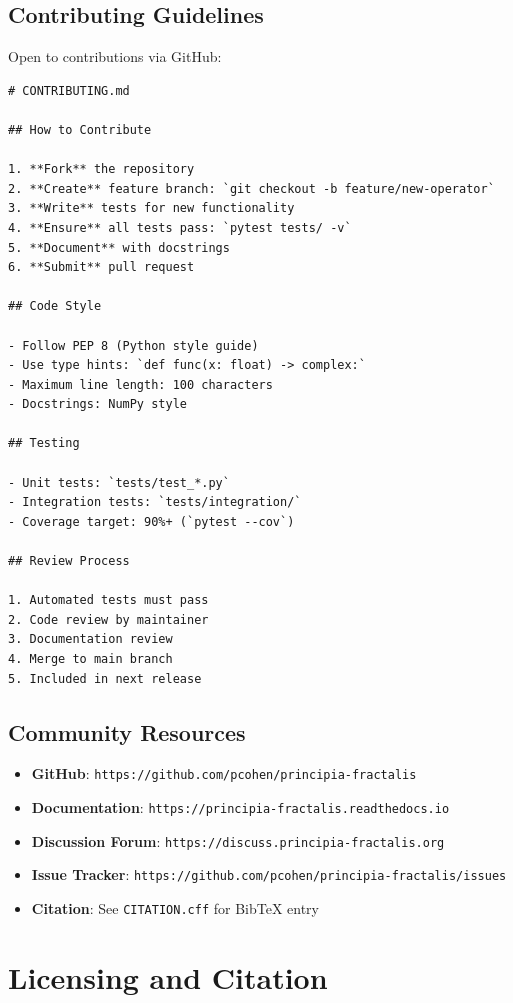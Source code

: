 \subsection{Contributing Guidelines}

Open to contributions via GitHub:

\begin{verbatim}
# CONTRIBUTING.md

## How to Contribute

1. **Fork** the repository
2. **Create** feature branch: `git checkout -b feature/new-operator`
3. **Write** tests for new functionality
4. **Ensure** all tests pass: `pytest tests/ -v`
5. **Document** with docstrings
6. **Submit** pull request

## Code Style

- Follow PEP 8 (Python style guide)
- Use type hints: `def func(x: float) -> complex:`
- Maximum line length: 100 characters
- Docstrings: NumPy style

## Testing

- Unit tests: `tests/test_*.py`
- Integration tests: `tests/integration/`
- Coverage target: 90%+ (`pytest --cov`)

## Review Process

1. Automated tests must pass
2. Code review by maintainer
3. Documentation review
4. Merge to main branch
5. Included in next release
\end{verbatim}

\subsection{Community Resources}

\begin{itemize}
\item \textbf{GitHub}: \texttt{https://github.com/pcohen/principia-fractalis}
\item \textbf{Documentation}: \texttt{https://principia-fractalis.readthedocs.io}
\item \textbf{Discussion Forum}: \texttt{https://discuss.principia-fractalis.org}
\item \textbf{Issue Tracker}: \texttt{https://github.com/pcohen/principia-fractalis/issues}
\item \textbf{Citation}: See \texttt{CITATION.cff} for BibTeX entry
\end{itemize}

\section{Licensing and Citation}
\label{sec:licensing}

